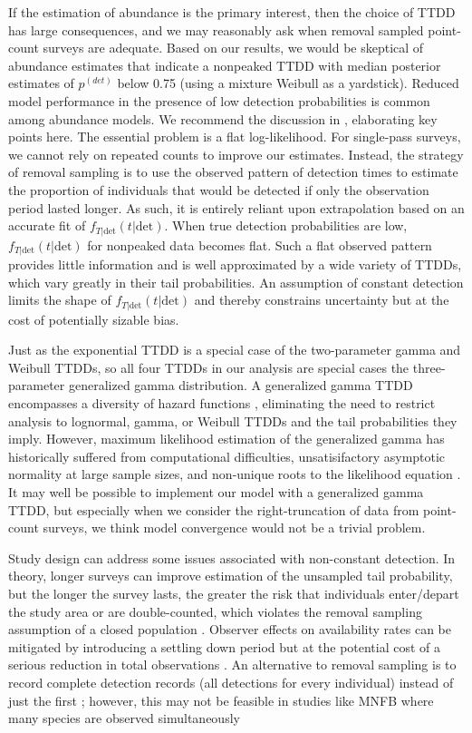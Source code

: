 \documentclass[12pt]{article}
\newcommand{\pdet}{p^{(det)}}
\newcommand{\dt}{\text{det}}
\newcommand{\ftdt}{f_{T|\dt}(t|\dt)}
\begin{document}
If the estimation of abundance is the primary interest, then the choice of TTDD has large consequences, and we may reasonably ask when removal sampled point-count surveys are adequate.
Based on our results, we would be skeptical of abundance estimates that indicate a nonpeaked TTDD with median posterior estimates of $\pdet$ below 0.75 (using a mixture Weibull as a yardstick).
Reduced model performance in the presence of low detection probabilities is common among abundance models.
We recommend the discussion in \citet{CoullAgresti1999}, elaborating key points here.
The essential problem is a flat log-likelihood.
For single-pass surveys, we cannot rely on repeated counts to improve our estimates.
Instead, the strategy of removal sampling is to use the observed pattern of detection times to estimate the proportion of individuals that would be detected if only the observation period lasted longer.  
As such, it is entirely reliant upon extrapolation based on an accurate fit of $\ftdt$.
When true detection probabilities are low, $\ftdt$ for nonpeaked data becomes flat.
Such a flat observed pattern provides little information and is well approximated by a wide variety of TTDDs, which vary greatly in their tail probabilities.
An assumption of constant detection limits the shape of $\ftdt$ and thereby constrains uncertainty but at the cost of potentially sizable bias.

Just as the exponential TTDD is a special case of the two-parameter gamma and Weibull TTDDs, so all four TTDDs in our analysis are special cases the three-parameter generalized gamma distribution.
A generalized gamma TTDD encompasses a diversity of hazard functions \citep{Cox2007}, 
eliminating the need to restrict analysis to lognormal, gamma, or Weibull TTDDs and the tail probabilities they imply.
However, maximum likelihood estimation of the generalized gamma has historically suffered from computational difficulties, unsatisifactory asymptotic normality at large sample sizes, and non-unique roots to the likelihood equation \citep{CoorayAnand2008, NoufailyJones2013}.
It may well be possible to implement our model with a generalized gamma TTDD, but especially when we consider the right-truncation of data from point-count surveys, we think model convergence would not be a trivial problem.

Study design can address some issues associated with non-constant detection.
In theory, longer surveys can improve estimation of the unsampled tail probability, but the longer the survey lasts, the greater the risk that individuals enter/depart the study area or are double-counted, which violates the removal sampling assumption of a closed population \citep{LeeMarsden2008, Reidy2011}.  
Observer effects on availability rates can be mitigated by introducing a settling down period but at the potential cost of a serious reduction in total observations \citep{LeeMarsden2008}.
An alternative to removal sampling is to record complete detection records (all detections for every individual) instead of just the first \citep{Alldredge2007}; however, this may not be feasible in studies like MNFB where many species are observed simultaneously
\end{document}
